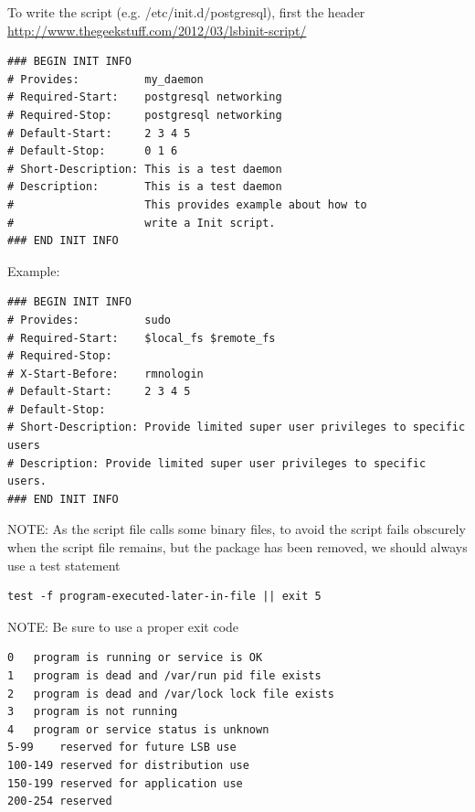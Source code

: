 To write the script (e.g. /etc/init.d/postgresql), first the header
\url{http://www.thegeekstuff.com/2012/03/lsbinit-script/}
\begin{verbatim}
### BEGIN INIT INFO
# Provides:          my_daemon
# Required-Start:    postgresql networking
# Required-Stop:     postgresql networking
# Default-Start:     2 3 4 5
# Default-Stop:      0 1 6
# Short-Description: This is a test daemon
# Description:       This is a test daemon
#                    This provides example about how to
#                    write a Init script.
### END INIT INFO
\end{verbatim}
Example:
\begin{verbatim}
### BEGIN INIT INFO
# Provides:          sudo
# Required-Start:    $local_fs $remote_fs
# Required-Stop:
# X-Start-Before:    rmnologin
# Default-Start:     2 3 4 5
# Default-Stop:
# Short-Description: Provide limited super user privileges to specific users
# Description: Provide limited super user privileges to specific users.
### END INIT INFO
\end{verbatim}

\begin{mdframed}
NOTE: As the script file calls some binary files, to avoid the script fails
obscurely when the script file remains, but the package has been removed, we
should always use a test statement
\begin{verbatim}
test -f program-executed-later-in-file || exit 5
\end{verbatim}

NOTE: Be sure to use a proper exit code
\begin{verbatim}
0	program is running or service is OK
1	program is dead and /var/run pid file exists
2	program is dead and /var/lock lock file exists
3	program is not running
4	program or service status is unknown
5-99	reserved for future LSB use
100-149	reserved for distribution use
150-199	reserved for application use
200-254	reserved
\end{verbatim}
\end{mdframed}

